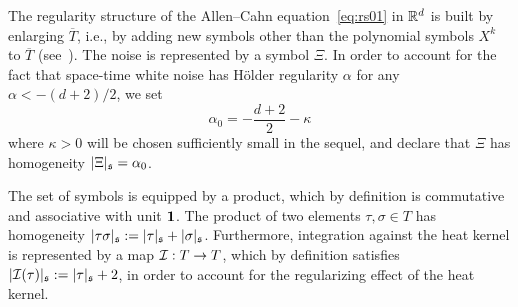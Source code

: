 \documentclass[reqno,11pt]{article}
\def\unit{\vone}
\def\abss#1{\abs{#1}_\mathfrak{s}}
\def\Tbar{\overline T}
\begin{document}
The regularity structure of the Allen--Cahn equation~\eqref{eq:rs01} in $\mathbb{R}^d$
is built by enlarging $\Tbar$, i.e., by adding new symbols other than the 
polynomial symbols $X^k$ to $\Tbar$ (see~\cite{Hairer_Weber_15}). The noise
is represented by a symbol $\Xi$. In order to account for the fact that
space-time white noise has H\"older regularity $\alpha$ for any $\alpha <
-(d+2)/2$, we set 
\begin{equation}
 \label{eq:rs04}
 \alpha_0 = -\frac{d+2}{2} - \kappa
\end{equation}
where $\kappa>0$ will be chosen sufficiently small in the sequel, and declare
that $\Xi$ has homogeneity $\abss{\Xi} = \alpha_0$. 

The set of symbols is equipped by a product, which by definition is commutative
and associative with unit $\unit$. The product of two elements $\tau,\sigma \in
T$ has homogeneity $\abss{\tau\sigma} := \abss{\tau} + \abss{\sigma}$.
Furthermore, integration against the heat kernel is represented by a map
${\mathcal I}:T\rightarrow T$, which by definition satisfies $\abss{\cI(\tau)} :=
\abss{\tau} + 2$, in order to account for the regularizing effect of the heat
kernel. 
\end{document}
